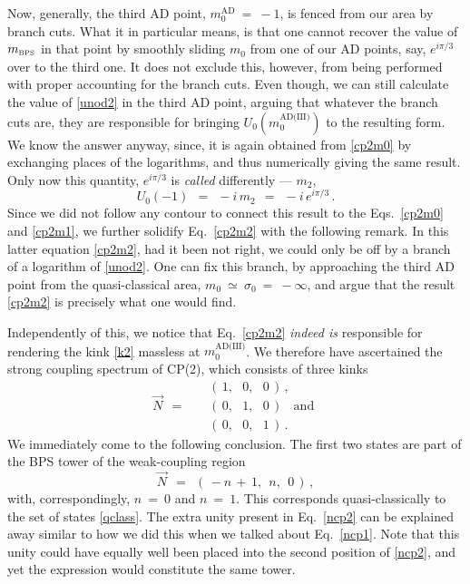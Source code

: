 \documentclass[epsfig,12pt]{article}
\def\beq{\begin{equation}}
\def\eeq{\end{equation}}
\def\beq{\begin{equation}}
\def\eeq{\end{equation}}
\newcommand{\mbps}{m_{\text{\tiny BPS}}}
\begin{document}
	Now, generally, the third AD point, $ m_0^\text{AD} ~=~ -1 $, is fenced from our area by branch cuts.
	What it in particular means, is that one cannot recover the value of $ \mbps $ in that point by smoothly sliding
	$ m_0 $ from one of our AD points, say, $ e^{ i \pi / 3 } $ over to the third one.
	It does not exclude this, however, from being performed with proper accounting for the branch cuts.
	Even though, we can still calculate the value of \eqref{unod2} in the third AD point, arguing that
	whatever the branch cuts are, they are responsible for bringing $ U_0(m_0^\text{AD(III)}) $ to the resulting form.
	We know the answer anyway, since, it is again obtained from \eqref{cp2m0} by exchanging places of the logarithms,
	and thus numerically giving the same result.
	Only now this quantity, $ e^{ i \pi / 3} $ is {\it called} differently --- $ m_2 $,
\beq
\label{cp2m2}
	U_0(-1) ~~=~~ -i\, m_2 ~~=~~ -i\, e^{ i \pi / 3}\,.
\eeq
	Since we did not follow any contour to connect this result to the Eqs.~\eqref{cp2m0} and \eqref{cp2m1},
	we further solidify Eq.~\eqref{cp2m2} with the following remark.
	In this latter equation \eqref{cp2m2}, had it been not right, we could only be off by a branch of a 
	logarithm of \eqref{unod2}.
	One can fix this branch, by approaching the third AD point from the quasi-classical area, 
	$ m_0 ~\simeq~ \sigma_0 ~=~ - \infty $, and argue that the result \eqref{cp2m2} is precisely
	what one would find.

	Independently of this, we notice that Eq.~\eqref{cp2m2} {\it indeed is} responsible for rendering the kink \eqref{k2}
	massless at $ m_0^\text{AD(III)} $.
	We therefore have ascertained the strong coupling spectrum of CP(2), which consists of three kinks
\beq
\label{scp2}
	\vec{N} ~~=~~ 
			\quad
				\begin{array}{l}
					(\, 1,~~~   0,~~~   0 \,)\,, \\[1.5mm]
					(\, 0,~~~   1,~~~   0 \,)~~~~ \text{and} \\[1.5mm]
					(\, 0,~~ ~  0,~~~   1 \,)\,.
				\end{array} 
\eeq
	We immediately come to the following conclusion. 
	The first two states are part of the BPS tower of the weak-coupling region 
\beq
\label{ncp2}
	\vec{N} ~~=~~ (\, -n \,+\, 1,~~ n,~~ 0 \,)\,,
\eeq
	with, correspondingly, $ n ~=~ 0 $ and $ n ~=~ 1 $.
	This corresponds quasi-classically to the set of states \eqref{qclass}.
	The extra unity present in Eq.~\eqref{ncp2} can be explained away 
	similar to how we did this when we talked about Eq.~\eqref{ncp1}.
	Note that this unity could have equally well been placed into the second position of \eqref{ncp2},
	and yet the expression would constitute the same tower.
\end{document}
